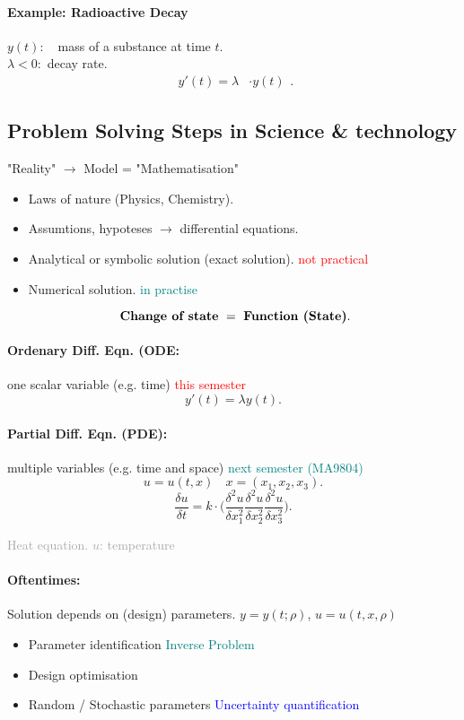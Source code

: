 \documentclass[]{article}
\begin{document}
	\paragraph{Example: Radioactive Decay}
	$~$\\$y(t):~~~$ mass of a substance at time $t$.\\
	$\lambda<0:$ decay rate.
	\[
	\begin{split}
	y'(t)=  \lambda &\cdot y(t)
	\end{split} 
	.\]
\subsection{Problem Solving Steps in Science \& technology}
	"Reality" $ \longrightarrow $ Model = "Mathematisation"
	\begin{itemize}
		\item Laws of nature (Physics, Chemistry).
		\item Assumtions, hypoteses $ \rightarrow $ differential equations.
		\item Analytical or symbolic solution (exact solution). \textcolor{red}{not practical} 
		\item Numerical solution. \textcolor{teal}{in practise}
	\end{itemize}
	\[
		\text{ \textbf{Change of state}  }= \text{ \textbf{Function (State)}}
	.\]
	\paragraph{Ordenary Diff. Eqn. (ODE:} one scalar variable (e.g. time) \textcolor{red}{this semester}
	\[
	y'(t)=\lambda y(t)
	.\]
	\paragraph{Partial Diff. Eqn. (PDE):} multiple variables (e.g. time and space) \textcolor{teal}{next semester (MA9804)}
	\[
		u=u(t,x)\,\,\,~~x=(x_1,x_2,x_3) 
	.\]
	\[
		\frac{\delta u}{\delta t}=k \cdot \big( \frac{\delta ^{2}u}{\delta x_1 ^{2}}\frac{\delta ^{2}u}{\delta x_2 ^{2}}\frac{\delta ^{2}u}{\delta x_3 ^{2}}\big)
	.\]
	\begin{center}
		\textcolor{darkgray}{Heat equation. $u$: temperature}
	\end{center}

	\paragraph{Oftentimes:} Solution depends on (design) parameters. $y=y(t;\rho)$, $u=u(t,x,\rho)$
	\begin{itemize}
		\item Parameter identification \textcolor{teal}{Inverse Problem}
		\item Design optimisation
		\item Random / Stochastic parameters \textcolor{blue}{Uncertainty quantification}
	\end{itemize}
\end{document}

